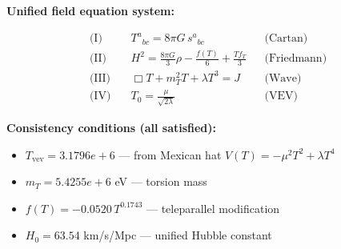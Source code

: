 
\textbf{Unified field equation system:}

\begin{align}
  \text{(I)} \quad & T^a{}_{bc} = 8\pi G \, s^a{}_{bc} && \text{(Cartan)} \\
  \text{(II)} \quad & H^2 = \frac{8\pi G}{3}\rho - \frac{f(T)}{6} + \frac{Tf_T}{3} && \text{(Friedmann)} \\
  \text{(III)} \quad & \Box T + m_T^2 T + \lambda T^3 = J && \text{(Wave)} \\
  \text{(IV)} \quad & T_0 = \frac{\mu}{\sqrt{2\lambda}} && \text{(VEV)}
\end{align}

\textbf{Consistency conditions (all satisfied):}
\begin{itemize}
  \item $T_{\text{vev}} = 3.1796e+6$ — from Mexican hat $V(T) = -\mu^2 T^2 + \lambda T^4$
  \item $m_T = 5.4255e+6$ eV — torsion mass
  \item $f(T) = -0.0520 \, T^{0.1743}$ — teleparallel modification
  \item $H_0 = 63.54$ km/s/Mpc — unified Hubble constant
\end{itemize}